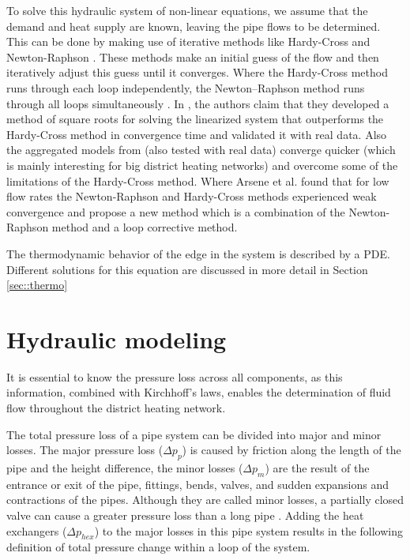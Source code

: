 To solve this hydraulic system of non-linear equations, we assume that the demand and heat supply are known, leaving the pipe flows to be determined. This can be done by making use of iterative methods like Hardy-Cross \cite{HardyCross} and Newton-Raphson \cite{NewtonenHard}. These methods make an initial guess of the flow and then iteratively adjust this guess until it converges. Where the Hardy-Cross method runs through each loop independently, the Newton–Raphson method runs through all loops simultaneously \cite{NewtonenHard}. In \cite{STEVANOVIC}, the authors claim that they developed a method of square roots for solving the linearized system that outperforms the Hardy-Cross method in convergence time and validated it with real data. Also the aggregated models from \cite{LARSEN2002995} (also tested with real data) converge quicker (which is mainly interesting for big district heating networks) and overcome some of the limitations of the Hardy-Cross method. Where Arsene et al. \cite{ARSENE} found that for low flow rates the Newton-Raphson and Hardy-Cross methods experienced weak convergence and propose a new method which is a combination of the Newton-Raphson method and a loop corrective method. 

The thermodynamic behavior of the edge in the system is described by a PDE. Different solutions for this equation are discussed in more detail in Section \ref{sec::thermo}

\section{Hydraulic modeling}\label{sec::hydromodel}
It is essential to know the pressure loss across all components, as this information, combined with Kirchhoff's laws, enables the determination of fluid flow throughout the district heating network. 

The total pressure loss of a pipe system can be divided into major and minor losses. The major pressure loss ($\Delta p_p$) is caused by friction along the length of the pipe and the height difference, the minor losses ($\Delta p_m$) are the result of the entrance or exit of the pipe, fittings, bends, valves, and sudden expansions and contractions of the pipes. Although they are called minor losses, a partially closed valve can cause a greater pressure loss than a long pipe \cite{white2011fluid}. Adding the heat exchangers ($\Delta p_{hex}$) to the major losses in this pipe system results in the following definition of total pressure change within a loop of the system. 

